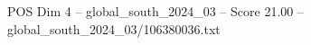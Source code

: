\begin{textsample}{POS Dim 4 – global\_south\_2024\_03 – Score 21.00 – global\_south\_2024\_03/106380036.txt}
\end{textsample}
